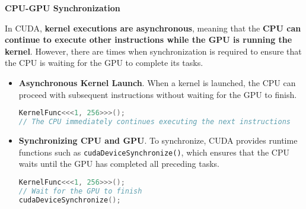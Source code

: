 \highspace
\begin{flushleft}
    \textcolor{Green3}{ \textbf{CPU-GPU Synchronization}}
\end{flushleft}
In CUDA, \textbf{kernel executions are asynchronous}, meaning that the \textbf{CPU can continue to execute other instructions while the GPU is running the kernel}. However, there are times when synchronization is required to ensure that the CPU is waiting for the GPU to complete its tasks.
\begin{itemize}
    \item \textbf{Asynchronous Kernel Launch}. When a kernel is launched, the CPU can proceed with subsequent instructions without waiting for the GPU to finish.
\begin{lstlisting}[language=C++]
KernelFunc<<<1, 256>>>();
// The CPU immediately continues executing the next instructions
\end{lstlisting}

    \item \textbf{Synchronizing CPU and GPU}. To synchronize, CUDA provides runtime functions such as \texttt{cudaDeviceSynchronize()}, which ensures that the CPU waits until the GPU has completed all preceding tasks.
\begin{lstlisting}[language=C++]
KernelFunc<<<1, 256>>>();
// Wait for the GPU to finish
cudaDeviceSynchronize();
\end{lstlisting}
\end{itemize}

